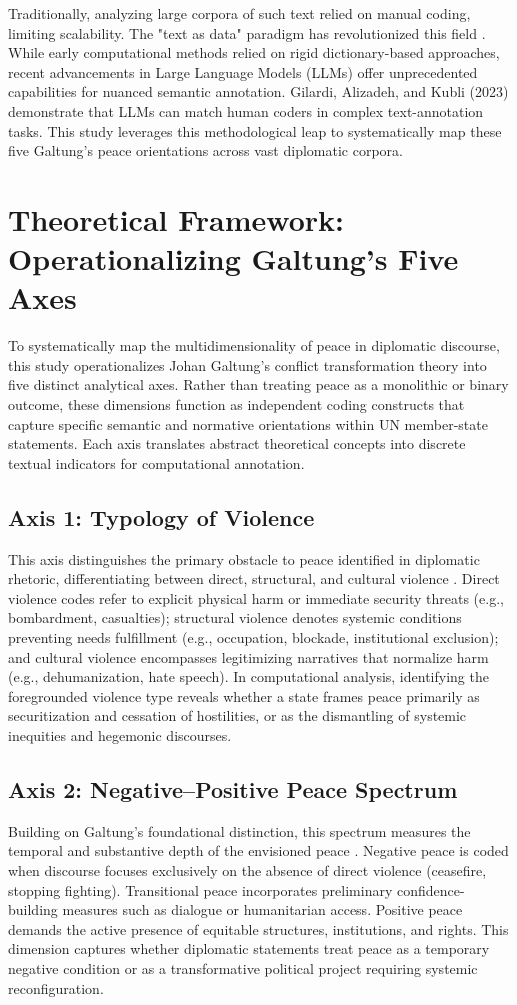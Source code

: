\documentclass[sigconf,review,anonymous,balance=false]{acmart}
\begin{document}
Traditionally, analyzing large corpora of such text relied on manual coding, limiting scalability. The "text as data" paradigm has revolutionized this field \cite{grimmer2013text}. While early computational methods relied on rigid dictionary-based approaches, recent advancements in Large Language Models (LLMs) offer unprecedented capabilities for nuanced semantic annotation. Gilardi, Alizadeh, and Kubli (2023) demonstrate that LLMs can match human coders in complex text-annotation tasks. This study leverages this methodological leap to systematically map these five Galtung's peace orientations across vast diplomatic corpora.

\section{Theoretical Framework: Operationalizing Galtung's Five Axes}
\label{sec:framework}
To systematically map the multidimensionality of peace in diplomatic discourse, this study operationalizes Johan Galtung’s conflict transformation theory into five distinct analytical axes. Rather than treating peace as a monolithic or binary outcome, these dimensions function as independent coding constructs that capture specific semantic and normative orientations within UN member-state statements. Each axis translates abstract theoretical concepts into discrete textual indicators for computational annotation.
\subsection{Axis 1: Typology of Violence}
This axis distinguishes the primary obstacle to peace identified in diplomatic rhetoric, differentiating between direct, structural, and cultural violence \cite{galtung1969violence}. Direct violence codes refer to explicit physical harm or immediate security threats (e.g., bombardment, casualties); structural violence denotes systemic conditions preventing needs fulfillment (e.g., occupation, blockade, institutional exclusion); and cultural violence encompasses legitimizing narratives that normalize harm (e.g., dehumanization, hate speech). In computational analysis, identifying the foregrounded violence type reveals whether a state frames peace primarily as securitization and cessation of hostilities, or as the dismantling of systemic inequities and hegemonic discourses.
\subsection{Axis 2: Negative--Positive Peace Spectrum}
Building on Galtung’s foundational distinction, this spectrum measures the temporal and substantive depth of the envisioned peace \cite{galtung1969violence,galtung2012peace}. Negative peace is coded when discourse focuses exclusively on the absence of direct violence (ceasefire, stopping fighting). Transitional peace incorporates preliminary confidence-building measures such as dialogue or humanitarian access. Positive peace demands the active presence of equitable structures, institutions, and rights. This dimension captures whether diplomatic statements treat peace as a temporary negative condition or as a transformative political project requiring systemic reconfiguration.
\end{document}
